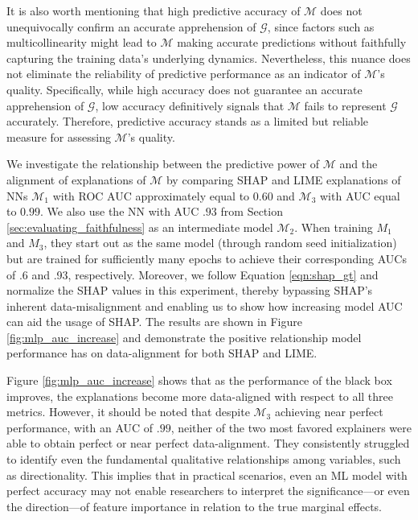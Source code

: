 \documentclass[mnsc,blindrev]{informs3}
\newcommand{\mM}{\mathcal{M}}
\begin{document}
           It is also worth mentioning that high predictive accuracy of $\mathcal{M}$ does not unequivocally confirm an accurate apprehension of $\mathcal{G}$, since factors such as multicollinearity might lead to $\mathcal{M}$ making accurate predictions without faithfully capturing the training data's underlying dynamics. Nevertheless, this nuance does not eliminate the reliability of predictive performance as an indicator of $\mathcal{M}$'s quality. Specifically, while high accuracy does not guarantee an accurate apprehension of $\mathcal{G}$, low accuracy definitively signals that $\mathcal{M}$ fails to represent $\mathcal{G}$ accurately. Therefore, predictive accuracy stands as a limited but reliable measure for assessing $\mathcal{M}$'s quality.
 
            
            We investigate the relationship between the predictive power of $\mathcal{M}$ and the alignment of explanations of $\mM$ by comparing SHAP and LIME explanations of NNs $\mathcal{M}_1$  with ROC AUC approximately equal to $0.60$ and $\mathcal{M}_3$ with AUC equal to $0.99$. We also use the NN with AUC $.93$ from Section \ref{sec:evaluating_faithfulness} as an intermediate model $\mathcal{M}_2$. When training $M_1$ and $M_3$, they start out as the same model (through random seed initialization) but are trained for sufficiently many epochs to achieve their corresponding AUCs of .6 and .93, respectively. Moreover, we follow Equation \ref{eqn:shap_gt} and normalize the SHAP values in this experiment, thereby bypassing SHAP's inherent data-misalignment and enabling us to show how increasing model AUC can aid the usage of SHAP. The results are shown in Figure \ref{fig:mlp_auc_increase} and demonstrate the positive relationship model performance has on data-alignment for both SHAP and LIME.
            
     Figure \ref{fig:mlp_auc_increase} shows that as the performance of the black box improves, the explanations become more data-aligned with respect to all three metrics. However, it should be noted that despite $\mathcal{M}_3$ achieving near perfect performance, with an AUC of $.99$, neither of the two most favored explainers were able to obtain perfect or near perfect data-alignment. They consistently struggled to identify even the fundamental qualitative relationships among variables, such as directionality. This implies that in practical scenarios, even an ML model with perfect accuracy may not enable researchers to interpret the significance—or even the direction—of feature importance in relation to the true marginal effects.  
     
\end{document}
